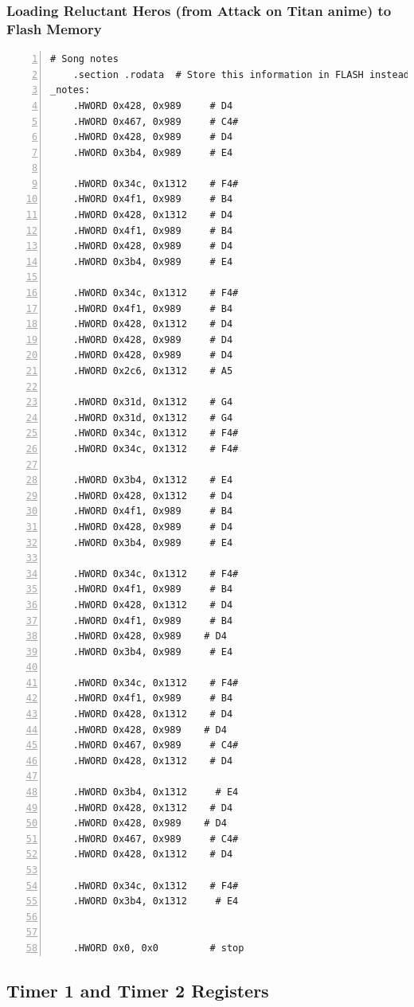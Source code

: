 \documentclass[11pt]{article}
\begin{document}
\subsubsection{Loading Reluctant Heros (from Attack on Titan anime) to Flash Memory}
\begin{lstlisting}[numbers=left,basicstyle=\footnotesize]
# Song notes
    .section .rodata  # Store this information in FLASH instead of RAM
_notes:
    .HWORD 0x428, 0x989     # D4
    .HWORD 0x467, 0x989     # C4#
    .HWORD 0x428, 0x989     # D4
    .HWORD 0x3b4, 0x989     # E4

    .HWORD 0x34c, 0x1312    # F4#
    .HWORD 0x4f1, 0x989     # B4
    .HWORD 0x428, 0x1312    # D4
    .HWORD 0x4f1, 0x989     # B4
    .HWORD 0x428, 0x989     # D4
    .HWORD 0x3b4, 0x989     # E4
    
    .HWORD 0x34c, 0x1312    # F4#
    .HWORD 0x4f1, 0x989     # B4
    .HWORD 0x428, 0x1312    # D4
    .HWORD 0x428, 0x989     # D4
    .HWORD 0x428, 0x989     # D4
    .HWORD 0x2c6, 0x1312    # A5

    .HWORD 0x31d, 0x1312    # G4
    .HWORD 0x31d, 0x1312    # G4
    .HWORD 0x34c, 0x1312    # F4#
    .HWORD 0x34c, 0x1312    # F4#

    .HWORD 0x3b4, 0x1312    # E4
    .HWORD 0x428, 0x1312    # D4
    .HWORD 0x4f1, 0x989     # B4
    .HWORD 0x428, 0x989     # D4
    .HWORD 0x3b4, 0x989     # E4

    .HWORD 0x34c, 0x1312    # F4#
    .HWORD 0x4f1, 0x989     # B4
    .HWORD 0x428, 0x1312    # D4
    .HWORD 0x4f1, 0x989     # B4
    .HWORD 0x428, 0x989    # D4
    .HWORD 0x3b4, 0x989     # E4

    .HWORD 0x34c, 0x1312    # F4#
    .HWORD 0x4f1, 0x989     # B4
    .HWORD 0x428, 0x1312    # D4
    .HWORD 0x428, 0x989    # D4
    .HWORD 0x467, 0x989     # C4#
    .HWORD 0x428, 0x1312    # D4

    .HWORD 0x3b4, 0x1312     # E4
    .HWORD 0x428, 0x1312    # D4
    .HWORD 0x428, 0x989    # D4
    .HWORD 0x467, 0x989     # C4#
    .HWORD 0x428, 0x1312    # D4

    .HWORD 0x34c, 0x1312    # F4#
    .HWORD 0x3b4, 0x1312     # E4
    

    .HWORD 0x0, 0x0         # stop
\end{lstlisting}

\clearpage

\subsection{Timer 1 and Timer 2 Registers}
\end{document}
